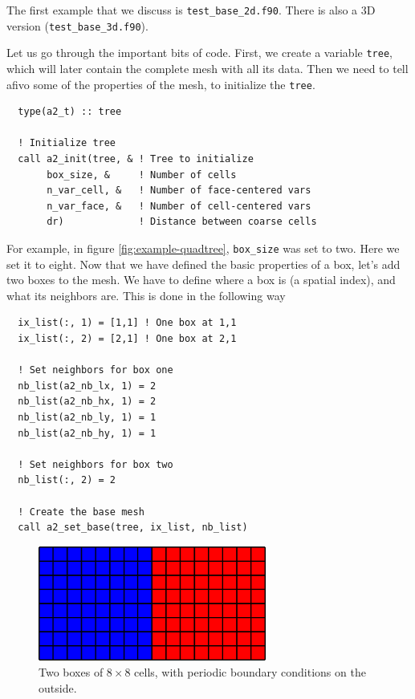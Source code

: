 \documentclass[a4paper, a4wide]{article}
\begin{document}
The first example that we discuss is \texttt{test\_base\_2d.f90}.
There is also a 3D version (\texttt{test\_base\_3d.f90}).

Let us go through the important bits of code.
First, we create a variable \texttt{tree}, which will later contain the complete
mesh with all its data.
Then we need to tell afivo some of the properties of the mesh, to initialize the
\texttt{tree}.

\begin{lstlisting}
  type(a2_t) :: tree

  ! Initialize tree
  call a2_init(tree, & ! Tree to initialize
       box_size, &     ! Number of cells
       n_var_cell, &   ! Number of face-centered vars
       n_var_face, &   ! Number of cell-centered vars
       dr)             ! Distance between coarse cells
\end{lstlisting}

For example, in figure \ref{fig:example-quadtree}, \texttt{box\_size} was set to
two. Here we set it to eight.
Now that we have defined the basic properties of a box, let's add two boxes to
the mesh.
We have to define where a box is (a spatial index), and what its neighbors
are.
This is done in the following way
\begin{lstlisting}
  ix_list(:, 1) = [1,1] ! One box at 1,1
  ix_list(:, 2) = [2,1] ! One box at 2,1

  ! Set neighbors for box one
  nb_list(a2_nb_lx, 1) = 2
  nb_list(a2_nb_hx, 1) = 2
  nb_list(a2_nb_ly, 1) = 1
  nb_list(a2_nb_hy, 1) = 1

  ! Set neighbors for box two
  nb_list(:, 2) = 2

  ! Create the base mesh
  call a2_set_base(tree, ix_list, nb_list)
\end{lstlisting}

\begin{figure}
  \centering
  \includegraphics[width=7.5cm]{figures/two_boxes.png}
  \caption{Two boxes of $8 \times 8$ cells, with periodic boundary conditions on
  the outside.}
  \label{fig:two-boxes}
\end{figure}
\end{document}
